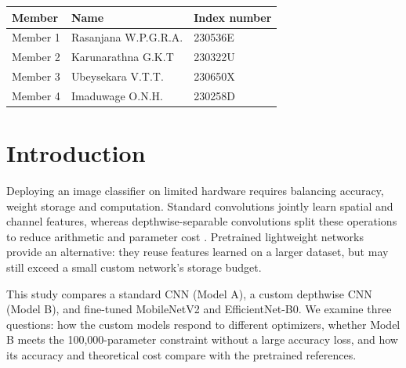 \documentclass[11pt,a4paper]{article}
\newcommand{\StudentName}{Rasanjana W.P.G.R.A.}
\newcommand{\IndexNumber}{230536E}
\begin{document}
\begin{table}[h]
\centering
\renewcommand{\arraystretch}{1.8}
\begin{tabularx}{\textwidth}{lXl}
\toprule
Member & Name & Index number \\
\midrule
Member 1 & \StudentName & \IndexNumber \\
Member 2 & Karunarathna G.K.T & 230322U \\
Member 3 & Ubeysekara V.T.T. & 230650X \\
Member 4 & Imaduwage O.N.H. & 230258D \\
\bottomrule
\end{tabularx}
\end{table}
\clearpage
\tableofcontents
\clearpage
{}
\begin{abstract}
We compare two custom convolutional networks on EuroSAT RGB under a matched, single-seed training protocol. Both models use the same split, normalization, augmentation, batch size, 40-epoch budget and optimizer settings. Model A achieves 95.48\% test accuracy with Adam and 95.95\% with momentum SGD. Model B achieves 96.69\% and 97.14\%, respectively, with 96,538 parameters, below the 100,000-parameter limit. Separate pretrained MobileNetV2 and EfficientNet-B0 reference experiments achieve 97.65\% and 97.85\%. Model B offers lower parameter storage and counted arithmetic than Model A, but the comparison concerns complete architectures, not convolution type alone. Single-seed results and prior test-set reuse limit generalization claims.
\end{abstract}
\section{Introduction}
Deploying an image classifier on limited hardware requires balancing accuracy, weight storage and computation. Standard convolutions jointly learn spatial and channel features, whereas depthwise-separable convolutions split these operations to reduce arithmetic and parameter cost \cite{mobilenet}. Pretrained lightweight networks provide an alternative: they reuse features learned on a larger dataset, but may still exceed a small custom network's storage budget.

This study compares a standard CNN (Model A), a custom depthwise CNN (Model B), and fine-tuned MobileNetV2 and EfficientNet-B0. We examine three questions: how the custom models respond to different optimizers, whether Model B meets the 100,000-parameter constraint without a large accuracy loss, and how its accuracy and theoretical cost compare with the pretrained references.
\end{document}
